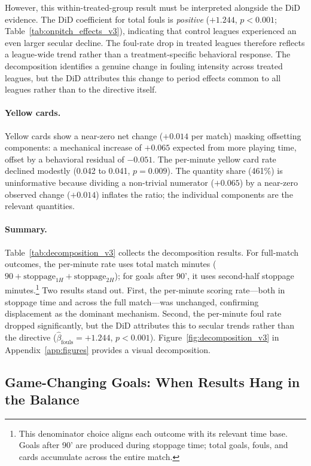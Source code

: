 \documentclass[12pt]{article}
\begin{document}
However, this within-treated-group result must be interpreted alongside the DiD evidence. The DiD coefficient for total fouls is \emph{positive} ($+1.244$, $p < 0.001$; Table~\ref{tab:onpitch_effects_v3}), indicating that control leagues experienced an even larger secular decline. The foul-rate drop in treated leagues therefore reflects a league-wide trend rather than a treatment-specific behavioral response. The decomposition identifies a genuine change in fouling intensity across treated leagues, but the DiD attributes this change to period effects common to all leagues rather than to the directive itself.

\paragraph{Yellow cards.} Yellow cards show a near-zero net change ($+0.014$ per match) masking offsetting components: a mechanical increase of $+0.065$ expected from more playing time, offset by a behavioral residual of $-0.051$. The per-minute yellow card rate declined modestly (0.042 to 0.041, $p = 0.009$). The quantity share (461\%) is uninformative because dividing a non-trivial numerator ($+0.065$) by a near-zero observed change ($+0.014$) inflates the ratio; the individual components are the relevant quantities.

\paragraph{Summary.} Table~\ref{tab:decomposition_v3} collects the decomposition results. For full-match outcomes, the per-minute rate uses total match minutes ($90 + \text{stoppage}_{1H} + \text{stoppage}_{2H}$); for goals after 90', it uses second-half stoppage minutes.\footnote{This denominator choice aligns each outcome with its relevant time base. Goals after 90' are produced during stoppage time; total goals, fouls, and cards accumulate across the entire match.} Two results stand out. First, the per-minute scoring rate---both in stoppage time and across the full match---was unchanged, confirming displacement as the dominant mechanism. Second, the per-minute foul rate dropped significantly, but the DiD attributes this to secular trends rather than the directive ($\hat{\beta}_{\text{fouls}} = +1.244$, $p < 0.001$). Figure~\ref{fig:decomposition_v3} in Appendix~\ref{app:figures} provides a visual decomposition.




\subsection{Game-Changing Goals: When Results Hang in the Balance}
\label{subsec:game_changing}
\end{document}
